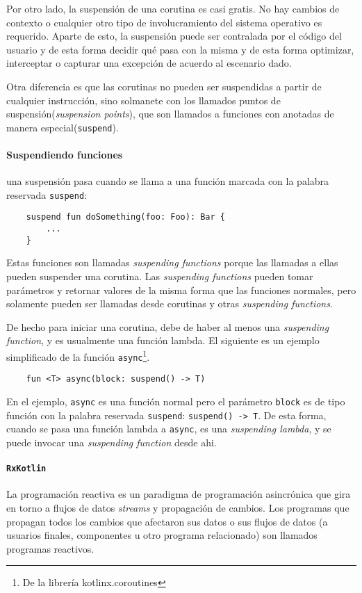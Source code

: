 Por otro lado, la suspensión de una corutina es casi gratis. No hay cambios de contexto o cualquier otro tipo de involucramiento del sistema operativo es requerido. Aparte de esto, la suspensión puede ser contralada por el código del usuario y de esta forma decidir qué pasa con la misma y de esta forma optimizar, interceptar o capturar una excepción de acuerdo al escenario dado.

Otra diferencia es que las corutinas no pueden ser suspendidas a partir de cualquier instrucción, sino solmanete con los llamados puntos de suspensión(\emph{suspension points}), que son llamados a funciones con anotadas de manera especial(\texttt{suspend}).

\paragraph{Suspendiendo funciones} una suspensión pasa cuando se llama a una función marcada con la palabra reservada \texttt{suspend}:
\begin{verbatim}
    suspend fun doSomething(foo: Foo): Bar {
        ...
    }
\end{verbatim}
Estas funciones son llamadas \emph{suspending functions} porque las llamadas a ellas pueden suspender una corutina. Las \emph{suspending functions} pueden tomar parámetros y retornar valores de la misma forma que las funciones normales, pero solamente pueden ser llamadas desde corutinas y otras \emph{suspending functions}.

De hecho para iniciar una corutina, debe de haber al menos una \emph{suspending function}, y es usualmente una función lambda. El siguiente es un ejemplo simplificado de la función \texttt{async}\footnote{De la librería kotlinx.coroutines}.
\begin{verbatim}
    fun <T> async(block: suspend() -> T)
\end{verbatim}
En el ejemplo, \texttt{async} es una función normal pero el parámetro \texttt{block} es de tipo función con la palabra reservada \texttt{suspend}: \texttt{suspend() -> T}. De esta forma, cuando se pasa una función lambda a \texttt{async}, es una \emph{suspending lambda}, y se puede invocar una \emph{suspending function} desde ahi.

\paragraph{\texttt{RxKotlin}\cite{rxkotlin}} La programación reactiva es un paradigma de programación asincrónica que gira en torno a flujos de datos \emph{streams} y propagación de cambios. Los programas que propagan todos los cambios que afectaron sus datos o sus flujos de datos (a usuarios finales, componentes u otro programa relacionado) son llamados programas reactivos.

